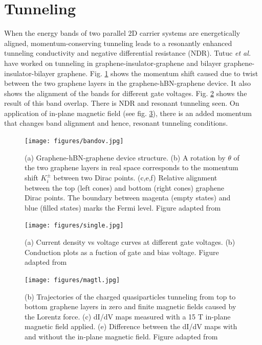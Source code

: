 \section{Tunneling}
\label{section:t}
When the energy bands of two parallel 2D carrier systems are energetically aligned, momentum-conserving tunneling leads to a resonantly enhanced tunneling conductivity and negative differential resistance (NDR). Tutuc \textit{et al.} have worked on tunneling in graphene-insulator-graphene \cite{Mishchenko2014} and bilayer graphene-insulator-bilayer graphene. \cite{Tutuc,Tutuc17,Tutuc18} Fig. \ref{fig:bandov} shows the momentum shift caused due to twist between the two graphene layers in the graphene-hBN-graphene device. It also shows the alignment of the bands for different gate voltages. Fig. \ref{fig:single} shows the result of this band overlap. There is NDR and resonant tunneling seen. On application of in-plane magnetic field (see fig. \ref{fig:magtl}), there is an added momentum that changes band alignment and hence, resonant tunneling conditions.

\begin{figure}[H]
	\centering
	\texttt{[image: figures/bandov.jpg]}
	\caption{(a) Graphene-hBN-graphene device structure. (b) A rotation by $\theta$ of the two graphene layers in real space corresponds to the momentum shift $K_i^\pm$ between two Dirac points. (c,e,f) Relative alignment between the top (left cones) and bottom (right cones) graphene Dirac points. The boundary between magenta (empty states) and blue (filled states) marks the Fermi level. Figure adapted from \cite{Mishchenko2014}}
	\label{fig:bandov}
\end{figure}

\begin{figure}[H]
	\centering
	\texttt{[image: figures/single.jpg]}
	\caption{(a) Current density vs voltage curves at different gate voltages. (b) Conduction plots as a fuction of gate and bias voltage. Figure adapted from \cite{Mishchenko2014}}
	\label{fig:single}
\end{figure}

\begin{figure}[H]
	\centering
	\texttt{[image: figures/magtl.jpg]}
	\caption{(b) Trajectories of the charged quasiparticles tunneling from top to bottom graphene layers in zero and finite magnetic fields caused by the Lorentz force. (c) dI/dV maps measured with a 15 T in-plane magnetic field applied. (e) Difference between the dI/dV maps with and without the in-plane magnetic field. Figure adapted from \cite{Mishchenko2014}}
	\label{fig:magtl}
\end{figure}

